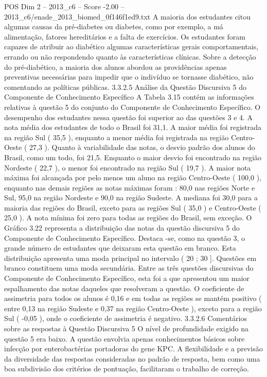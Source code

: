\begin{textsample}{POS Dim 2 – 2013\_c6 – Score -2.00 – 2013\_c6/enade\_2013\_biomed\_0f146f1ed9.txt}
A maioria dos estudantes citou algumas causas da pré-diabetes ou diabetes, como por exemplo, a má alimentação, fatores hereditários e a falta de exercícios.
Os estudantes foram capazes de atribuir ao diabético algumas características gerais comportamentais, errando ou não respondendo quanto às características clínicas.
Sobre a detecção do pré-diabético, a maioria dos alunos abordou as providências apenas preventivas necessárias para impedir que o indivíduo se tornasse diabético, não comentando as políticas públicas. 3.3.2.5 Análise da Questão Discursiva 5 do Componente de Conhecimento Específico A Tabela 3.15 contém as informações relativas à questão 5 do conjunto do Componente de Conhecimento Específico.
O desempenho dos estudantes nessa questão foi superior ao das questões 3 e 4.
A nota média dos estudantes de todo o Brasil foi 31,1.
A maior média foi registrada na região Sul ( 35,5 ), enquanto a menor média foi registrada na região Centro-Oeste ( 27,3 ).
Quanto à variabilidade das notas, o desvio padrão dos alunos do Brasil, como um todo, foi 21,5.
Enquanto o maior desvio foi encontrado na região Nordeste ( 22,7 ), o menor foi encontrado na região Sul ( 19,7 ).
A maior nota máxima foi alcançada por pelo menos um aluno na região Centro-Oeste ( 100,0 ), enquanto nas demais regiões as notas máximas foram : 80,0 nas regiões Norte e Sul, 95,0 na região Nordeste e 90,0 na região Sudeste.
A mediana foi 30,0 para a maioria das regiões do Brasil, exceto para as regiões Sul ( 35,0 ) e Centro-Oeste ( 25,0 ).
A nota mínima foi zero para todas as regiões do Brasil, sem exceção.
O Gráfico 3.22 representa a distribuição das notas da questão discursiva 5 do Componente de Conhecimento Específico.
Destaca -se, como na questão 3, o grande número de estudantes que deixaram esta questão em branco.
Esta distribuição apresenta uma moda principal no intervalo ( 20 ; 30 ].
Questões em branco constituem uma moda secundária.
Entre as três questões discursivas do Componente de Conhecimento Específico, esta foi a que apresentou um maior espalhamento das notas daqueles que resolveram a questão.
O coeficiente de assimetria para todos os alunos é 0,16 e em todas as regiões se mantém positivo ( entre 0,13 na região Sudeste e 0,37 na região Centro-Oeste ), exceto para a região Sul ( -0,05 ), onde o coeficiente de assimetria é negativo. 3.3.2.6 Comentários sobre as respostas à Questão Discursiva 5 O nível de profundidade exigido na questão 5 era baixo.
A questão envolvia apenas conhecimentos básicos sobre infecção por enterobactérias portadoras do gene KPC.
A flexibilidade e a previsão da diversidade das respostas consideradas no padrão de resposta, bem como uma boa subdivisão dos critérios de pontuação, facilitaram o trabalho de correção.

\end{textsample}
